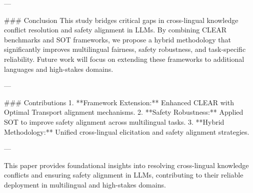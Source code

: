 ---

### Conclusion  
This study bridges critical gaps in cross-lingual knowledge conflict resolution and safety alignment in LLMs. By combining CLEAR benchmarks and SOT frameworks, we propose a hybrid methodology that significantly improves multilingual fairness, safety robustness, and task-specific reliability. Future work will focus on extending these frameworks to additional languages and high-stakes domains.

---

### Contributions  
1. **Framework Extension:** Enhanced CLEAR with Optimal Transport alignment mechanisms.  
2. **Safety Robustness:** Applied SOT to improve safety alignment across multilingual tasks.  
3. **Hybrid Methodology:** Unified cross-lingual elicitation and safety alignment strategies.  

---  

This paper provides foundational insights into resolving cross-lingual knowledge conflicts and ensuring safety alignment in LLMs, contributing to their reliable deployment in multilingual and high-stakes domains.